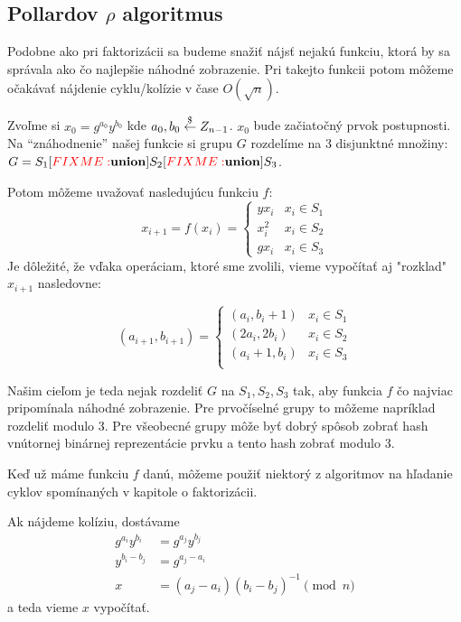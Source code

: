 \subsection{Pollardov $\rho$ algoritmus}
Podobne ako pri faktorizácii sa budeme snažiť nájsť nejakú funkciu, ktorá
by sa správala ako čo najlepšie náhodné zobrazenie. Pri takejto funkcii
potom môžeme očakávať nájdenie cyklu/kolízie v čase $O(\sqrt{n})$.

Zvoľme si $x_0 = g^{a_0} y^{b_0}$ kde $a_0,b_0 \overset{\$}{\leftarrow} Z_{n-1}$.
$x_0$ bude začiatočný prvok postupnosti. Na ``znáhodnenie'' našej funkcie
si grupu $G$ rozdelíme na 3 disjunktné množiny:
\def\union{\fixme{union}}
$G=S_1 \union S_2 \union  S_3$.

Potom môžeme uvažovať nasledujúcu funkciu $f$:
\begin{equation*}
    x_{i+1} = f(x_i) =
        \begin{cases}
         y x_i & x_i \in S_1 \\
         x_i^2 & x_i \in S_2 \\
         g x_i & x_i \in S_3
        \end{cases}
\end{equation*}
Je dôležité, že vďaka operáciam, ktoré sme zvolili, vieme vypočítať aj
"rozklad" $x_{i+1}$ nasledovne:

\begin{equation*}
    (a_{i+1},b_{i+1}) =
        \begin{cases}
         (a_i,b_i+1) & x_i \in S_1 \\
         (2a_i,2b_i) & x_i \in S_2 \\
         (a_i+1,b_i) & x_i \in S_3 \\
        \end{cases}
\end{equation*}

Našim cieľom je teda nejak rozdeliť $G$ na $S_1,S_2,S_3$ tak, aby
funkcia $f$ čo najviac pripomínala náhodné zobrazenie.
Pre prvočíselné grupy to môžeme napríklad rozdeliť modulo 3.
Pre všeobecné grupy môže byť dobrý spôsob zobrať hash vnútornej binárnej
reprezentácie prvku a tento hash zobrať modulo 3.

Keď už máme funkciu $f$ danú, môžeme použiť niektorý z algoritmov na
hľadanie cyklov spomínaných v kapitole o faktorizácii.

Ak nájdeme kolíziu, dostávame
\begin{align*}
    g^{a_i} y^{b_i} &= g^{a_j} y^{b_j} \\
    y^{b_i-b_j} &= g^{a_j-a_i} \\
    x &=(a_j - a_i)(b_i-b_j)^{-1} \pmod n
\end{align*}
a teda vieme $x$ vypočítať.

